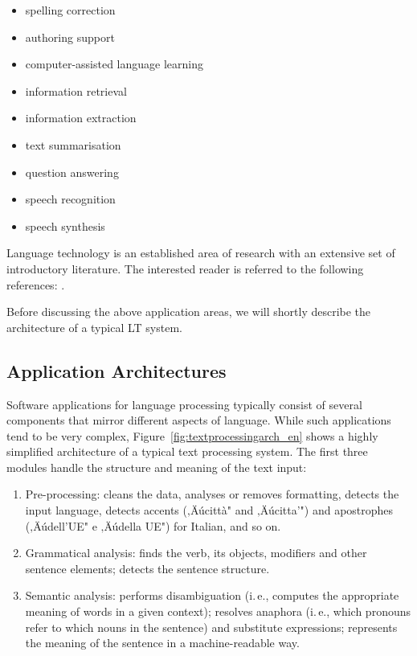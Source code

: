 \begin{multicols}{2}
\begin{itemize}
\item spelling correction
\item authoring support
\item computer-assisted language learning
\item information retrieval 
\item information extraction
\item text summarisation
\item question answering
\item speech recognition 
\item speech synthesis 
\end{itemize}

Language technology is an established area of research with an extensive set
of introductory literature. The interested reader is referred to the following
references:  \cite{carstensen-etal1, jurafsky-martin01, manning-schuetze1,
  lt-world1, lt-survey1}.

Before discussing the above application areas, we will shortly describe the
architecture of a typical LT system.

\subsection{Application Architectures}

Software applications for language processing typically consist of several
components that mirror different aspects of language. While such applications
tend to be very complex, Figure~\ref{fig:textprocessingarch_en} shows a 
highly simplified architecture of a typical text processing system. The first 
three modules handle the structure and meaning of the text input:

\begin{enumerate}
\item Pre-processing: cleans the data, analyses or removes formatting, detects
  the input language, detects accents (‚Äúcitt\`{a}" and ‚Äúcitta'") and apostrophes (‚Äúdell'UE" e ‚Äúdella UE") for Italian, and so on.
\item Grammatical analysis: finds the verb, its objects, modifiers and
  other sentence elements; detects the sentence structure.
\item Semantic analysis: performs disambiguation (i.\,e., computes the appropriate meaning of words in a given context); resolves anaphora (i.\,e., which pronouns refer to which nouns in the sentence) and substitute expressions; represents the meaning of the sentence in a machine-readable way.
\end{enumerate}


\end{multicols}
